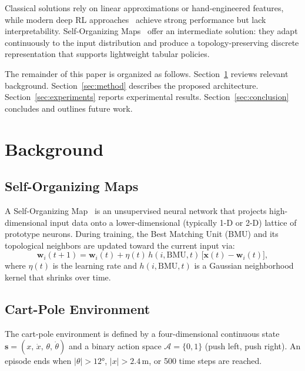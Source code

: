 \documentclass[conference]{IEEEtran}
\begin{document}
Classical solutions rely on linear approximations or hand-engineered features,
while modern deep RL approaches~\cite{mnih2015human} achieve strong performance
but lack interpretability.
Self-Organizing Maps~\cite{kohonen1990self} offer an intermediate solution:
they adapt continuously to the input distribution and produce a
topology-preserving discrete representation that supports lightweight tabular
policies.

The remainder of this paper is organized as follows.
Section~\ref{sec:background} reviews relevant background.
Section~\ref{sec:method} describes the proposed architecture.
Section~\ref{sec:experiments} reports experimental results.
Section~\ref{sec:conclusion} concludes and outlines future work.

\section{Background}
\label{sec:background}

\subsection{Self-Organizing Maps}

A Self-Organizing Map~\cite{kohonen1990self} is an unsupervised neural network
that projects high-dimensional input data onto a lower-dimensional (typically
1-D or 2-D) lattice of prototype neurons.
During training, the Best Matching Unit (BMU) and its topological neighbors
are updated toward the current input via:
%
\begin{equation}
  \mathbf{w}_i(t+1) = \mathbf{w}_i(t)
    + \eta(t)\, h(i, \text{BMU}, t)\,
      \bigl[\mathbf{x}(t) - \mathbf{w}_i(t)\bigr],
  \label{eq:som_update}
\end{equation}
%
where \(\eta(t)\) is the learning rate and \(h(i, \text{BMU}, t)\) is a
Gaussian neighborhood kernel that shrinks over time.

\subsection{Cart-Pole Environment}

The cart-pole environment is defined by a four-dimensional continuous state
\(\mathbf{s} = (x,\, \dot{x},\, \theta,\, \dot{\theta})\) and a binary action
space \(\mathcal{A} = \{0, 1\}\) (push left, push right).
An episode ends when \(|\theta| > 12°\), \(|x| > 2.4\,\text{m}\), or 500
time steps are reached.
\end{document}
